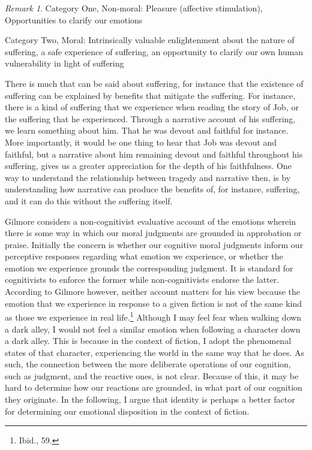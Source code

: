 \documentclass[phdthesis,12pt,final,a4paper]{wuthesis}
\theoremstyle{definition}
\theoremstyle{definition}
\theoremstyle{definition}
\theoremstyle{definition}
\theoremstyle{remark}
\newtheorem*{remark}{Remark}
\begin{document}
\begin{remark}
Category One, Non-moral: Pleasure (affective stimulation), Opportunities to clarify our emotions

Category Two, Moral: Intrinsically valuable enlightenment about the nature of suffering, a safe experience of suffering, an opportunity to clarify our own human vulnerability in light of suffering
\end{remark}

There is much that can be said about suffering, for instance that the existence of suffering can be explained by benefits that mitigate the suffering. For instance, there is a kind of suffering that we experience when reading the story of Job, or the suffering that he experienced. Through a narrative account of his suffering, we learn something about him. That he was devout and faithful for instance. More importantly, it would be one thing to hear that Job was devout and faithful, but a narrative about him remaining devout and faithful throughout his suffering, gives us a greater appreciation for the depth of his faithfulness. One way to understand the relationship between tragedy and narrative then, is by understanding how narrative can produce the benefits of, for instance, suffering, and it can do this without the suffering itself.

Gilmore considers a non-cognitivist evaluative account of the emotions wherein there is some way in which our moral judgments are grounded in approbation or praise. Initially the concern is whether our cognitive moral judgments inform our perceptive responses regarding what emotion we experience, or whether the emotion we experience grounds the corresponding judgment. It is standard for cognitivists to enforce the former while non-cognitivists endorse the latter. According to Gilmore however, neither account matters for his view because the emotion that we experience in response to a given fiction is not of the same kind as those we experience in real life.\footnote{Ibid., 59.} Although I may feel fear when walking down a dark alley, I would not feel a similar emotion when following a character down a dark alley. This is because in the context of fiction, I adopt the phenomenal states of that character, experiencing the world in the same way that he does. As such, the connection between the more deliberate operations of our cognition, such as judgment, and the reactive ones, is not clear. Because of this, it may be hard to determine how our reactions are grounded, in what part of our cognition they originate. In the following, I argue that identity is perhaps a better factor for determining our emotional disposition in the context of fiction.
\end{document}
